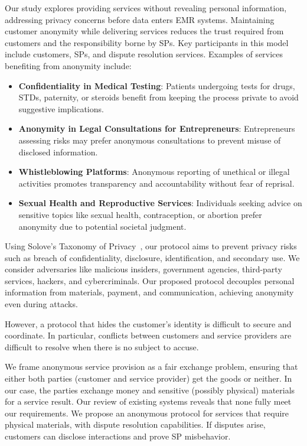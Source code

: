 \documentclass[pdftex,twocolumn,epjc3]{svjour3}
\begin{document}
\begin{sloppypar}
Our study explores providing services without revealing personal information, addressing privacy concerns before data enters EMR systems. Maintaining customer anonymity while delivering services reduces the trust required from customers and the responsibility borne by SPs. Key participants in this model include customers, SPs, and dispute resolution services. Examples of services benefiting from anonymity include:
\begin{itemize}
  \item \textbf{Confidentiality in Medical Testing}: Patients undergoing tests for drugs, STDs, paternity, or steroids benefit from keeping the process private to avoid suggestive implications.
  \item \textbf{Anonymity in Legal Consultations for Entrepreneurs}: Entrepreneurs assessing risks may prefer anonymous consultations to prevent misuse of disclosed information.
  \item \textbf{Whistleblowing Platforms}: Anonymous reporting of unethical or illegal activities promotes transparency and accountability without fear of reprisal.
  \item \textbf{Sexual Health and Reproductive Services}: Individuals seeking advice on sensitive topics like sexual health, contraception, or abortion prefer anonymity due to potential societal judgment.
\end{itemize}
\end{sloppypar}

\begin{sloppypar}
Using Solove's Taxonomy of Privacy~\cite{soloveTaxonomyPrivacy2006}, our protocol aims to prevent privacy risks such as breach of confidentiality, disclosure, identification, and secondary use. We consider adversaries like malicious insiders, government agencies, third-party services, hackers, and cybercriminals. Our proposed protocol decouples personal information from materials, payment, and communication, achieving anonymity even during attacks.
\end{sloppypar}

\begin{sloppypar}
However, a protocol that hides the customer's identity is difficult to secure and coordinate. In particular, conflicts between customers and service providers are difficult to resolve when there is no subject to accuse.
\end{sloppypar}

\begin{sloppypar}
We frame anonymous service provision as a fair exchange problem, ensuring that either both parties (customer and service provider) get the goods or neither. In our case, the parties exchange money and sensitive (possibly physical) materials for a service result. Our review of existing systems reveals that none fully meet our requirements. We propose an anonymous protocol for services that require physical materials, with dispute resolution capabilities. If disputes arise, customers can disclose interactions and prove SP misbehavior.
\end{sloppypar}
\end{document}
